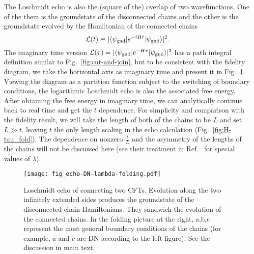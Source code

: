 The Loschmidt echo is also the (square of the) overlap of two wavefunctions. One of the them is the groundstate of the disconnected chains and the other is the groundstate evolved by the Hamiltonian of the connected chains
\begin{equation}
\mathcal{L}( t )  \equiv |\langle \psi_{\rm gnd}  | e^{-i H t } | \psi_{\rm gnd} \rangle|^2 .
\end{equation}
The imaginary time version $\mathcal{L}( \tau  ) = |\langle \psi_{\rm gnd}  | e^{-H \tau } | \psi_{\rm gnd} \rangle|^2$ has a path integral definition similar to Fig.~\ref{fig:cut-and-join}, but to be consistent with the fidelity diagram, we take the horizontal axis as imaginary time and present it in Fig.~\ref{fig:echo}. Viewing the diagram as a partition function subject to the switching of boundary conditions, the logarithmic Loschmidt echo is also the associated free energy. After obtaining the free energy in imaginary time, we can analytically continue back to real time and get the $t$ dependence. For simplicity and comparison with the fidelity result, we will take the length of both of the chains to be $L$ and set $L \gg t$, leaving $t$ the only length scaling in the echo calculation (Fig.~\ref{fig:H-tau_fold}). The dependence on nonzero $\frac{t}{L}$ and the asymmetry of the lengths of the chains will not be discussed here (see their treatment in Ref.~ for special values of $\lambda$).

\begin{figure}[h]
\centering
\texttt{[image: fig\_echo-DN-lambda-folding.pdf]}
\caption{Loschmidt echo of connecting two CFTs. Evolution along the two infinitely extended sides produces the groundstate of the disconnected chain Hamiltonians. They sandwich the evolution of the connected chains. In the folding picture at the right, a,b,c represent the most general boundary conditions of the chains (for example, $a$ and $c$ are DN according to the left figure). See the discussion in main text.}
\label{fig:echo}
\end{figure}

